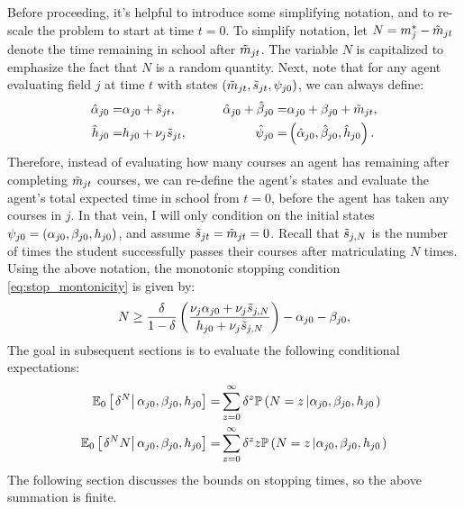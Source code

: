 Before proceeding, it's helpful to introduce some simplifying notation, and to re-scale the problem to start at time $t=0$. 
To simplify notation, let $N = \study_j^* - \tilde{\study}_{jt}$ denote the time remaining in school after $\tilde{\study}_{jt}$.
The variable $N$ is capitalized to emphasize the fact that $N$ is a random quantity. 
Next, note that for any agent evaluating field $j$ at time $t$ with states $\pr{\pstates}$, we can always define:
\begin{alignat*}{3}
    \hat{\alpha}_{j0} =& \alpha_{j0} + \tilde{\pass}_{jt},
    \quad \quad
    &\hat{\alpha}_{j0} + \hat{\beta}_{j0} 
    =& \alpha_{j0} + \beta_{j0} + \tilde{\study}_{jt},
    \\
    \hat{h}_{j0} 
    =& h_{j0} + \nu_j \tilde{\pass}_{jt}, 
    \quad \quad
    &\hat{\psi}_{j0} 
    =& 
    \pr{\hat{\alpha}_{j0}, \hat{\beta}_{j0}, \hat{h}_{j0}}.
\end{alignat*}
Therefore, instead of evaluating how many courses an agent has remaining after completing $\tilde{\study}_{jt}$ courses, we can re-define the agent's states and evaluate the agent's total expected time in school from $t=0$, before the agent has taken any courses in $j$.
In that vein, I will only condition on the initial states $\psi_{j0} = \pr{\alpha_{j0}, \beta_{j0}, h_{j0}}$, and assume $\tilde{\pass}_{jt} = \tilde{\study}_{jt} = 0$.
Recall that $\ks[,N]$ is the number of times the student successfully passes their courses after matriculating $N$ times. 
Using the above notation, the monotonic stopping condition \eqref{eq:stop_montonicity} is given by:
\begin{equation}\label{eq:stop_monotonicity_re_scaled}
    N \geq \frac{\delta}{1 - \delta}
    \pr{
        \frac{\nu_j \alpha_{j0} + \nu_j \ks[,N]}{h_{j0} + \nu_j \ks[,N]}
    } - \alpha_{j0} - \beta_{j0},
\end{equation}
The goal in subsequent sections is to evaluate the following conditional expectations:
\begin{align}    
    \nonumber
    \EE_0 \ce{\delta^N}{\alpha_{j0}, \beta_{j0}, h_{j0}}
    =&
    \sum_{z = 0}^\infty
    \delta^z
    \PP
    \pr{\crs{
        N = z
    }{\alpha_{j0}, \beta_{j0}, h_{j0}}}
    \\
    \label{eq:index_ce_n}
    \EE_0 \ce{\delta^N N}{\alpha_{j0}, \beta_{j0}, h_{j0}}
    =&
    \sum_{z = 0}^\infty
    \delta^z z
    \PP
    \pr{\crs{
        N = z
    }{\alpha_{j0}, \beta_{j0}, h_{j0}}}
\end{align}
The following section discusses the bounds on stopping times, so the above summation is finite.  





